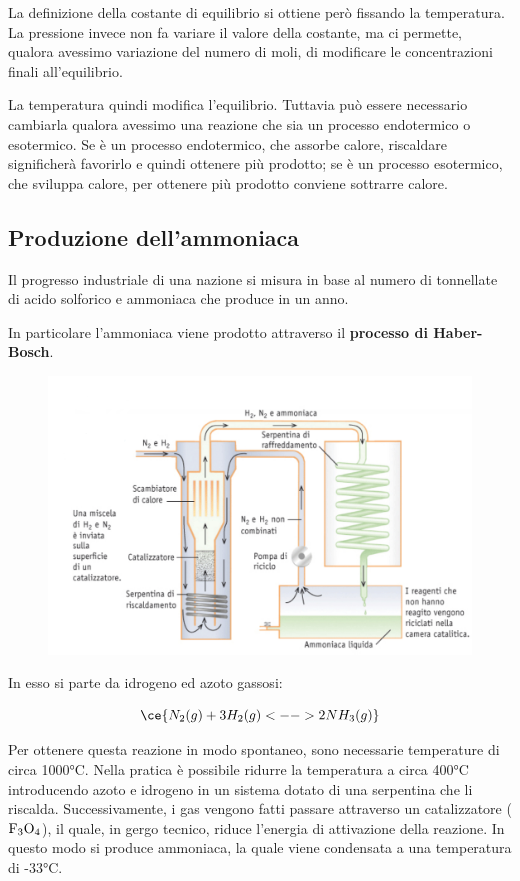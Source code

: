 \vspace{0.2cm}\normalsize La definizione della costante di equilibrio si ottiene però fissando la temperatura. La pressione invece non fa variare il valore della costante, ma ci permette, qualora avessimo variazione del numero di moli, di modificare le concentrazioni finali all'equilibrio.

La temperatura quindi modifica l'equilibrio. Tuttavia può essere necessario cambiarla qualora avessimo una reazione che sia un processo endotermico o esotermico. Se è un processo endotermico, che assorbe calore, riscaldare significherà favorirlo e quindi ottenere più prodotto; se è un processo esotermico, che sviluppa calore, per ottenere più prodotto conviene sottrarre calore.
\subsection{Produzione dell'ammoniaca}
Il progresso industriale di una nazione si misura in base al numero di tonnellate di acido solforico e ammoniaca che produce in un anno.

In particolare l'ammoniaca viene prodotto attraverso il \textbf{processo di Haber-Bosch}.

\vspace{-0.4cm}\begin{figure}[htp]
    \centering
    \includegraphics[width=14cm]{immagini/produzione_ammoniaca.png}
\end{figure}

In esso si parte da idrogeno ed azoto gassosi:

$$\ce{N_2(g) + 3H_2(g) <--> 2NH_3(g)}$$

Per ottenere questa reazione in modo spontaneo, sono necessarie temperature di circa 1000°C. Nella pratica è possibile ridurre la temperatura a circa 400°C introducendo azoto e idrogeno in un sistema dotato di una serpentina che li riscalda. Successivamente, i gas vengono fatti passare attraverso un catalizzatore ($\rm F_3O_4$), il quale, in gergo tecnico, riduce l'energia di attivazione della reazione. In questo modo si produce ammoniaca, la quale viene condensata a una temperatura di -33°C.

